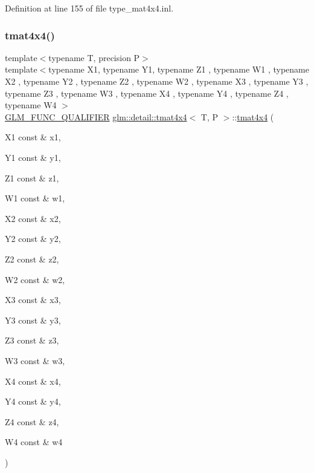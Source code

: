 Definition at line 155 of file type\+\_\+mat4x4.\+inl.

\mbox{\label{structglm_1_1detail_1_1tmat4x4_a4ff165b66bf5ce7b3a56f17727741389}} 
\subsubsection{\texorpdfstring{tmat4x4()}{tmat4x4()}\hspace{0.1cm}{\footnotesize\ttfamily [21/22]}}
{\footnotesize\ttfamily template$<$typename T, precision P$>$ \\
template$<$typename X1, typename Y1, typename Z1 , typename W1 , typename X2 , typename Y2 , typename Z2 , typename W2 , typename X3 , typename Y3 , typename Z3 , typename W3 , typename X4 , typename Y4 , typename Z4 , typename W4 $>$ \\
\hyperlink{setup_8hpp_a33fdea6f91c5f834105f7415e2a64407}{G\+L\+M\+\_\+\+F\+U\+N\+C\+\_\+\+Q\+U\+A\+L\+I\+F\+I\+ER} \hyperlink{structglm_1_1detail_1_1tmat4x4}{glm\+::detail\+::tmat4x4}$<$ T, P $>$\+::\hyperlink{structglm_1_1detail_1_1tmat4x4}{tmat4x4} (\begin{DoxyParamCaption}\item[{X1 const \&}]{x1,  }\item[{Y1 const \&}]{y1,  }\item[{Z1 const \&}]{z1,  }\item[{W1 const \&}]{w1,  }\item[{X2 const \&}]{x2,  }\item[{Y2 const \&}]{y2,  }\item[{Z2 const \&}]{z2,  }\item[{W2 const \&}]{w2,  }\item[{X3 const \&}]{x3,  }\item[{Y3 const \&}]{y3,  }\item[{Z3 const \&}]{z3,  }\item[{W3 const \&}]{w3,  }\item[{X4 const \&}]{x4,  }\item[{Y4 const \&}]{y4,  }\item[{Z4 const \&}]{z4,  }\item[{W4 const \&}]{w4 }\end{DoxyParamCaption})}



